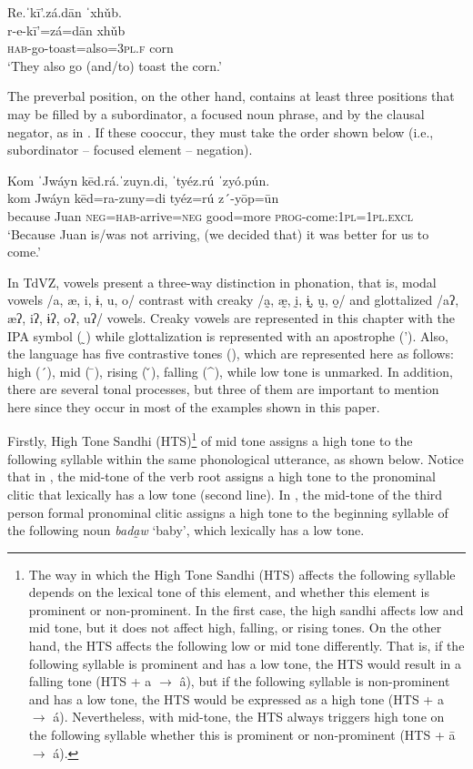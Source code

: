 \documentclass[output=paper,colorlinks=true, citecolor=brown]{langscibook}
\begin{document}
\ea\label{ex:zap:1} 
    \glll Re.ˈkī’.zá.dān ˈxhǔb.\\ 
          r-e-kī'=zá=dān xhǔb\\
          \textsc{hab}{}-go-toast=also=\textsc{3pl.f} corn\\
    \glt ‘They also go (and/to) toast the corn.’
\z 

The preverbal position, on the other hand, contains at least three positions that may be filled by a subordinator, a focused noun phrase, and by the clausal negator, as in . If these cooccur, they must take the order shown below (i.e., subordinator – focused element – negation).

\ea\label{ex:zap:2} 
    \glll Kom ˈJwáyn kēd.rá.ˈzuyn.di, ˈtyéz.rú ˈzyó.pún.\\ 
         kom Jwáyn kēd=ra-zuny=di tyéz=rú z´-yōp=ūn \\
         because Juan \textsc{neg}=\textsc{hab}{}-arrive=\textsc{neg} good=more \textsc{prog}{}-come:\textsc{1pl}=\textsc{1pl.excl} \\
    \glt ‘Because Juan is/was not arriving, (we decided that) it was better for us to come.’
\z 

In TdVZ, vowels present a three-way distinction in phonation, that is, modal vowels /a, æ, i, ɨ, u, o/ contrast with creaky /a̰, æ̰, ḭ, ɨ̰, ṵ, o̰/ and glottalized /aʔ, æʔ, iʔ, ɨʔ, oʔ, uʔ/ vowels. Creaky vowels are represented in this chapter with the IPA symbol  ( ̰) while glottalization is represented with an apostrophe (’). Also, the language has five contrastive tones (\citealt{UchiharaGutiérrez2019}), which are represented here as follows: high (´), mid ( \={}), rising ( \v{}), falling (\^{}), while low tone is unmarked. In addition, there are several tonal processes, but three of them are important to mention here since they occur in most of the examples shown in this paper.

Firstly, High Tone Sandhi (HTS)\footnote{The way in which the High Tone Sandhi (HTS) affects the following syllable depends on the lexical tone of this element, and whether this element is prominent or non-prominent. In the first case, the high sandhi affects low and mid tone, but it does not affect high, falling, or rising tones. On the other hand, the HTS affects the following low or mid tone differently. That is, if the following syllable is prominent and has a low tone, the HTS would result in a falling tone (HTS + a $\rightarrow$ â), but if the following syllable is non-prominent and has a low tone, the HTS would be expressed as a high tone (HTS + a $\rightarrow$ á). Nevertheless, with mid-tone, the HTS always triggers high tone on the following syllable whether this is prominent or non-prominent (HTS + ā $\rightarrow$ á).} of mid tone assigns a high tone to the following syllable within the same phonological utterance, as shown below. Notice that in , the mid-tone of the verb root assigns a high tone to the pronominal clitic that lexically has a low tone (second line). In , the mid-tone of the third person formal pronominal clitic assigns a high tone to the beginning syllable of the following noun \textit{bada̰w} ‘baby’, which lexically has a low tone.
\end{document}
